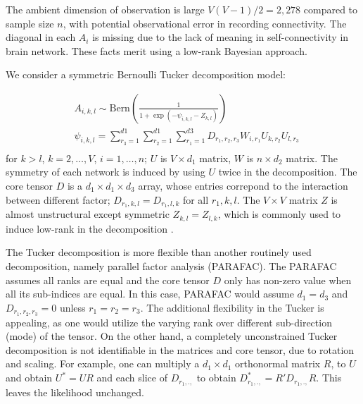 \documentclass[10pt]{article}
\DeclareMathOperator{\1}{\mathbbm{1}}
\begin{document}
The ambient dimension of observation is large $V(V-1)/2=2,278$ compared to sample size $n$, with potential observational error in recording connectivity. The diagonal in each $A_{i}$ is missing due to the lack of meaning in self-connectivity in brain network. These facts merit using a low-rank Bayesian approach.


We consider a symmetric Bernoulli Tucker decomposition model:


 \begin{equation*}
\begin{aligned}
& A_{i,k,l} \sim \text{Bern}( \frac{1}{1+ \exp(-\psi_{i,k,l}- Z_{k,l})})\\
& \psi_{i,k,l} = \sum_{r_3=1}^{d1}\sum_{r_2=1}^{d1}\sum_{r_1=1}^{d3} D_{r_1,r_2,r_3} W_{i,r_1} U_{k,r_2} U_{l,r_3}  \\
\end{aligned}
\end{equation*}
for $k>l$, $k=2,\ldots, V$, $i=1,\ldots,n$; $U$ is $V\times d_1$ matrix, $W$ is $n\times d_2$ matrix. The symmetry of each network is induced by using $U$ twice in the decomposition. The core tensor $D$ is a $d_1\times d_1\times d_3$ array, whose entries correpond to the interaction between different factor; $D_{r_1,k,l}=D_{r_1,l,k}$ for all $r_1,k,l$. The  $V\times V$ matrix $Z$ is almost unstructural except symmetric $Z_{k,l}=Z_{l,k}$, which is commonly used to induce low-rank in the decomposition \citep{durante2016nonparametric}.

The Tucker decomposition is more flexible than another routinely used decomposition, namely parallel factor analysis (PARAFAC). The PARAFAC assumes all ranks are equal and the core tensor $D$ only has non-zero value when all its sub-indices are equal. In this case, PARAFAC would assume $d_1=d_3$ and $D_{r_1,r_2,r_3}=0$ unless $r_1=r_2=r_3$. The additional flexibility in the Tucker is appealing, as one would utilize the varying rank over different sub-direction (mode) of the tensor. On the other hand, a completely unconstrained Tucker decomposition is not identifiable in the matrices and core tensor, due to rotation and scaling. For example, one can multiply a $d_1\times d_1$ orthonormal matrix $R$, to $U$ and obtain $U^*=UR$ and each slice of $D_{r_1,.,}$ to obtain $D^*_{r_1,.,}=R'D_{r_1,.,}R$. This leaves the likelihood unchanged.
\end{document}
